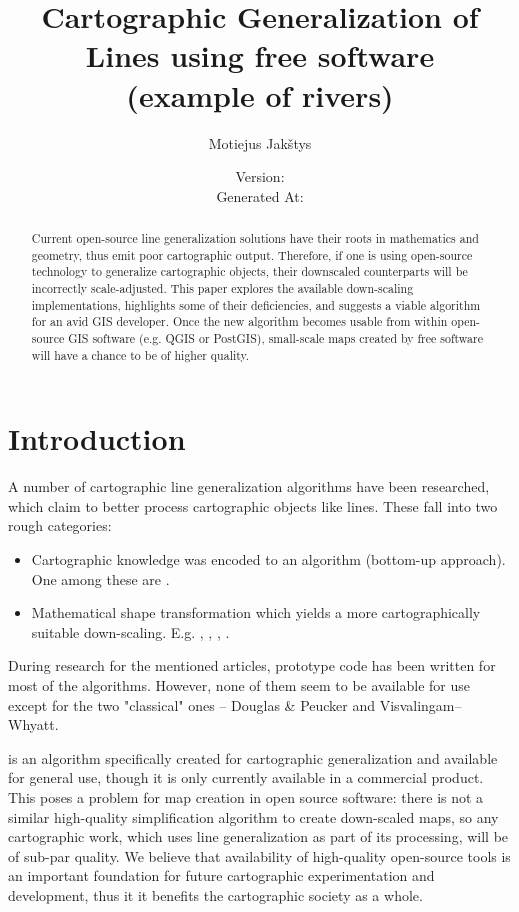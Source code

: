 \documentclass[a4paper]{article}
\title{
    Cartographic Generalization of Lines using free software \\
    (example of rivers) \\ \vspace{4mm}
}
\author{Motiejus Jakštys}
\date{
    \vspace{10mm}
    Version: \VCDescribe \\ \vspace{4mm}
    Generated At: \GeneratedAt
}
\newcommand{\DP}{Douglas \& Peucker}
\newcommand{\VW}{Visvalingam--Whyatt}
\begin{document}
\maketitle

\begin{abstract}
\label{sec:abstract}
Current open-source line generalization solutions have their roots in
    mathematics and geometry, thus emit poor cartographic output. Therefore, if
    one is using open-source technology to generalize cartographic objects,
    their downscaled counterparts will be incorrectly scale-adjusted. This
    paper explores the available down-scaling implementations, highlights some
    of their deficiencies, and suggests a viable algorithm for an avid GIS
    developer. Once the new algorithm becomes usable from within open-source
    GIS software (e.g. QGIS or PostGIS), small-scale maps created by free
    software will have a chance to be of higher quality.
\end{abstract}

\newpage

\tableofcontents
\listoffigures

\newpage

\section{Introduction}
\label{sec:introduction}

A number of cartographic line generalization algorithms have been researched,
which claim to better process cartographic objects like lines. These fall into
two rough categories:
\begin{itemize}
    \item Cartographic knowledge was encoded to an algorithm (bottom-up
        approach). One among these are \cite{wang1998line}.
    \item Mathematical shape transformation which yields a more
        cartographically suitable down-scaling. E.g. \cite{jiang2003line},
        \cite{dyken2009simultaneous}, \cite{mustafa2006dynamic},
        \cite{nollenburg2008morphing}.
\end{itemize}

During research for the mentioned articles, prototype code has been written for
most of the algorithms. However, none of them seem to be available for use
except for the two "classical" ones -- {\DP} and {\VW}.

\cite{wang1998line} is an algorithm specifically created for cartographic
generalization and available for general use, though it is only currently
available in a commercial product. This poses a problem for map creation in
open source software: there is not a similar high-quality simplification
algorithm to create down-scaled maps, so any cartographic work, which uses line
generalization as part of its processing, will be of sub-par quality.
We believe that availability of high-quality open-source tools is an important
foundation for future cartographic experimentation and development, thus it
it benefits the cartographic society as a whole.
\end{document}
